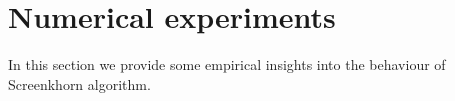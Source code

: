
\section{Numerical experiments} %
\label{sec:numerical_experiments}

In this section we provide some empirical insights into the behaviour of Screenkhorn algorithm.
